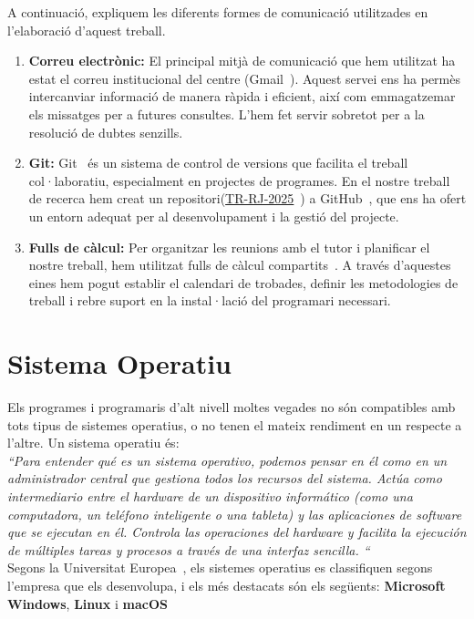 A continuació, expliquem les diferents formes de comunicació utilitzades en l'elaboració d'aquest treball.
\begin{enumerate}
\item \textbf{Correu electrònic:} El principal mitjà de comunicació que hem utilitzat ha estat el correu institucional del centre (Gmail~\cite{Gmail}). Aquest servei ens ha permès intercanviar informació de manera ràpida i eficient, així com emmagatzemar els missatges per a futures consultes. L’hem fet servir sobretot per a la resolució de dubtes senzills.

\item \textbf{Git:} Git~\cite{git} és un sistema de control de versions que facilita el treball col·laboratiu, especialment en projectes de programes. En el nostre treball de recerca hem creat un repositori(\href{https://github.com/Rui564/TR-RJ-2025}{TR-RJ-2025}~\cite{TR-RJ-2025}) a GitHub~\cite{GitHub}, que ens ha ofert un entorn adequat per al desenvolupament i la gestió del projecte.

\item \textbf{Fulls de càlcul:} Per organitzar les reunions amb el tutor i planificar el nostre treball, hem utilitzat fulls de càlcul compartits~\cite{FullDeCàlcul}. A través d’aquestes eines hem pogut establir el calendari de trobades, definir les metodologies de treball i rebre suport en la instal·lació del programari necessari.
\end{enumerate}

\section{Sistema Operatiu}
Els programes i programaris d'alt nivell moltes vegades no són compatibles amb tots tipus de sistemes operatius, o no tenen el mateix rendiment en un respecte a l'altre. %
Un sistema operatiu és:\\
\textit{``Para entender qué es un sistema operativo, podemos pensar en él como en un administrador central que gestiona todos los recursos del sistema. Actúa como intermediario entre el hardware de un dispositivo informático (como una computadora, un teléfono inteligente o una tableta) y las aplicaciones de software que se ejecutan en él. Controla las operaciones del hardware y facilita la ejecución de múltiples tareas y procesos a través de una interfaz sencilla. ``}\\
 Segons la Universitat Europea~\cite{UniversitatEuropea}, els sistemes operatius es classifiquen segons l’empresa que els desenvolupa, i els més destacats són els següents: \textbf{Microsoft Windows}, \textbf{Linux} i \textbf{macOS}

